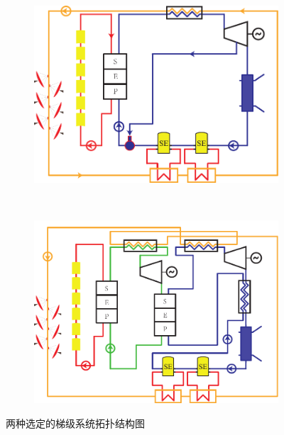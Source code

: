 \noindent \begin{figure}[htbp]
\centering
	\begin{subfigure}[b]{0.4\columnwidth}
	\includegraphics[width = \columnwidth]{fig/CascadeSystem1}
	\caption{}\label{fig:CascadeSystem1}
	\end{subfigure}
	~
\begin{subfigure}[b]{0.4\columnwidth}
	\includegraphics[width = \columnwidth]{fig/CascadeSystem2}
	\caption{}\label{fig:CascadeSystem2}
	\end{subfigure}
	\caption{两种选定的梯级系统拓扑结构图}
	\label{fig:CascadeSystems}
\end{figure}

